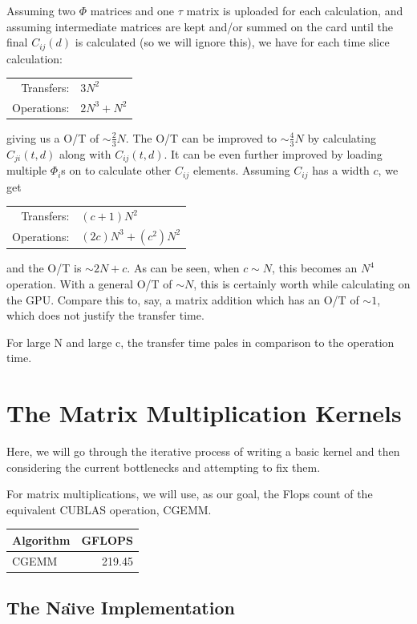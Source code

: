 \documentclass[a4paper,12pt]{report}
\newenvironment{CUDAtiming}%
{\setlength{\extrarowheight}{1.5pt} \begin{center}\begin{tabular}{l|r} Algorithm & GFLOPS\\\hline}%
{\end{tabular}\end{center}}
\begin{document}
Assuming two $\Phi$ matrices and one $\tau$ matrix is uploaded for each calculation, and assuming intermediate matrices are kept and/or summed on the card until the final $C_{ij}(d)$ is calculated (so we will ignore this), we have for each time slice calculation:

\begin{center}
\begin{tabular}{r l}
Transfers: & $3N^2$\\
Operations: & $2N^3 + N^2$
\end{tabular}
\end{center}

\noindent giving us a O/T of $\sim \frac{2}{3}N$.
The O/T can be improved to $\sim \frac{4}{3}N$ by calculating $C_{ji}(t,d)$ along with $C_{ij}(t,d)$.
It can be even further improved by loading multiple $\Phi_i$s on to calculate other $C_{ij}$ elements.
Assuming $C_{ij}$ has a width $c$, we get

\begin{center}
\begin{tabular}{r l}
Transfers: & $(c+1)N^2$\\
Operations: & $(2c)N^3 + (c^2)N^2$
\end{tabular}
\end{center}

\noindent and the O/T is $\sim 2N+c$.
As can be seen, when $c \sim N$, this becomes an $N^4$ operation.
With a general O/T of $\sim N$, this is certainly worth while calculating on the GPU.
Compare this to, say, a matrix addition which has an O/T of $\sim 1$, which does not justify the transfer time.

For large N and large c, the transfer time pales in comparison to the operation time.


\section{The Matrix Multiplication Kernels}

Here, we will go through the iterative process of writing a basic kernel and then considering the current bottlenecks and attempting to fix them.

For matrix multiplications, we will use, as our goal, the Flops count of the equivalent CUBLAS operation, CGEMM.

\begin{CUDAtiming}
CGEMM & 219.45
\end{CUDAtiming}

\subsection{The Na\"{\i}ve Implementation}
\end{document}
